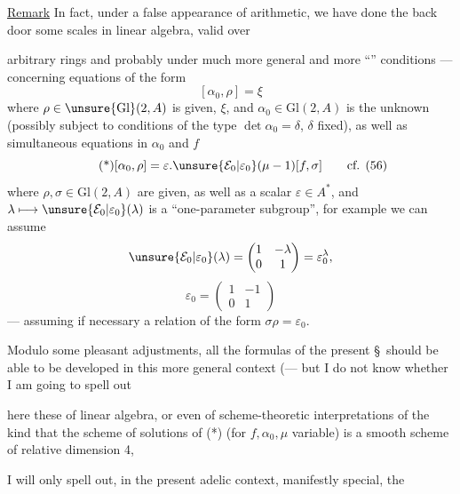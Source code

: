 \uline{Remark} In fact, under a false appearance of arithmetic, we have done  the back door some scales in linear algebra, valid over



arbitrary rings and  probably under much more general and more ``'' conditions --- concerning equations of the form
\[
[\alpha_0,\rho]=\xi
\]
where $\rho\in\unsure{\mathrm{Gl}}(2,A)$ is given,  $\xi$, and
$\alpha_0\in\mathrm{Gl}(2,A)$ is the unknown (possibly subject to conditions of the type $\det\alpha_0=\delta$, $\delta$ fixed), as well as simultaneous equations in $\alpha_0$ and $f$
\[
\tag{*}
[\alpha_0,\rho]=\varepsilon.\unsure{\mathcal{E}_0|\varepsilon_0}(\mu-1)[f,\sigma]
\qquad\text{cf. (56)}
\]
where $\rho,\sigma\in\mathrm{Gl}(2,A)$ are given, as well as a scalar $\varepsilon\in A^*$, and
$\lambda\longmapsto\unsure{\mathcal{E}_0|\varepsilon_0}(\lambda)$ is a ``one-parameter subgroup'', for example we can assume
\[
\unsure{\mathcal{E}_0|\varepsilon_0}(\lambda)=\begin{pmatrix}1&-\lambda\\0&1\end{pmatrix}=\varepsilon_0^\lambda,
\]
\[
\varepsilon_0=\begin{pmatrix}1&-1\\0&1\end{pmatrix}
\]
--- assuming if necessary a relation of the form $\sigma\rho=\varepsilon_0$.

Modulo some pleasant adjustments, all the formulas of the present \S\ should be able to be developed in this more general context
(--- but I do not know whether I am going to spell out



here these   of linear algebra,
or even of scheme-theoretic interpretations of the kind that the scheme of solutions of (*)
(for $f,\alpha_0,\mu$ variable) is a smooth  scheme of relative dimension 4, 

I will only spell out, in the present adelic context, manifestly  special, the


